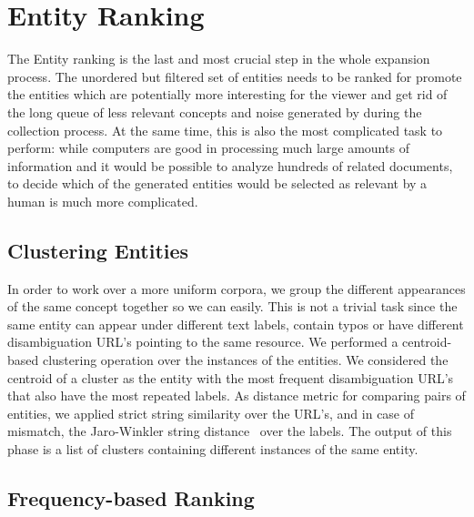 \documentclass{llncs}
\begin{document}

\section{Entity Ranking}
\label{sec:Ranking}

The Entity ranking is the last and most crucial step in the whole expansion process. The unordered but filtered set of entities needs to be ranked for promote the entities which are potentially more interesting for the viewer and get rid of the long queue of less relevant concepts and noise generated by during the collection process. At the same time, this is also the most complicated task to perform: while computers are good in processing much large amounts of information and it would be possible to analyze hundreds of related documents, to decide which of the generated entities would be selected as relevant by a human is much more complicated. 

\subsection{Clustering Entities}
In order to work over a more uniform corpora, we group the different appearances of the same concept together so we can easily. This is not a trivial task since the same entity can appear under different text labels, contain typos or have different disambiguation URL's pointing to the same resource. We performed a centroid-based clustering operation over the instances of the entities. We considered the centroid of a cluster as the entity with the most frequent disambiguation URL's that also have the most repeated labels. As distance metric for comparing pairs of entities, we applied strict string similarity over the URL's, and in case of mismatch, the Jaro-Winkler string distance~\cite{winkler2006overview} over the labels. The output of this phase is a list of clusters containing different instances of the same entity.

\subsection{Frequency-based Ranking}
\end{document}
